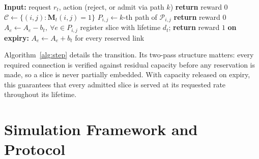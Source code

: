 \documentclass[10pt,journal,comsoc]{IEEEtran}
\begin{document}
\begin{algorithm}[t]
\caption{Environment step: admission and reservation}
\label{alg:step}
\scriptsize
\begin{algorithmic}[1]
\State \textbf{Input:} request $r_t$, action (reject, or admit via path $k$)
 \textbf{return} reward $0$ \EndIf
\State $\mathcal{C} \gets \{(i,j) : \mathbf{M}_t(i,j)=1\}$
 
   \State $P_{i,j} \gets k$-th path of $\mathcal{P}_{i,j}$
       \State \textbf{return} reward $0$ 
   \EndIf
\EndFor
{} $A_e \gets A_e - b_t,\ \forall e \in P_{i,j}$ \EndFor
\State register slice with lifetime $d_t$; \textbf{return} reward $1$
\State \textbf{on expiry:} $A_e \gets A_e + b_t$ for every reserved link
\end{algorithmic}
\end{algorithm}

Algorithm~\ref{alg:step} details the transition. Its two-pass structure
matters: every required connection is verified against residual capacity
before any reservation is made, so a slice is never partially embedded.
With capacity released on expiry, this guarantees that every admitted
slice is served at its requested rate throughout its lifetime.

\section{Simulation Framework and Protocol} \label{expSetup}
\end{document}
